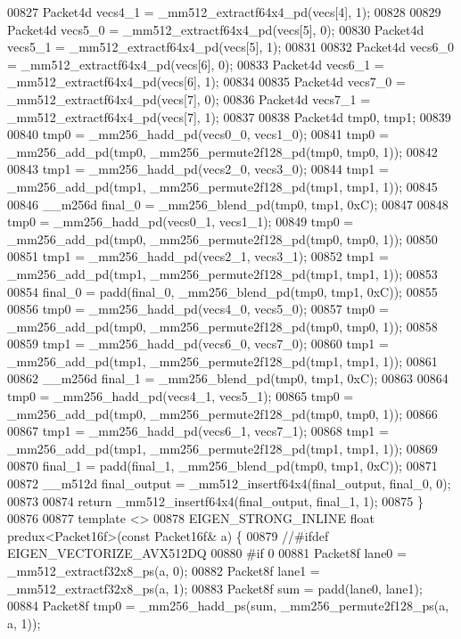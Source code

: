 \begin{DoxyCode}
00827   Packet4d vecs4\_1 = \_mm512\_extractf64x4\_pd(vecs[4], 1);
00828 
00829   Packet4d vecs5\_0 = \_mm512\_extractf64x4\_pd(vecs[5], 0);
00830   Packet4d vecs5\_1 = \_mm512\_extractf64x4\_pd(vecs[5], 1);
00831 
00832   Packet4d vecs6\_0 = \_mm512\_extractf64x4\_pd(vecs[6], 0);
00833   Packet4d vecs6\_1 = \_mm512\_extractf64x4\_pd(vecs[6], 1);
00834 
00835   Packet4d vecs7\_0 = \_mm512\_extractf64x4\_pd(vecs[7], 0);
00836   Packet4d vecs7\_1 = \_mm512\_extractf64x4\_pd(vecs[7], 1);
00837 
00838   Packet4d tmp0, tmp1;
00839 
00840   tmp0 = \_mm256\_hadd\_pd(vecs0\_0, vecs1\_0);
00841   tmp0 = \_mm256\_add\_pd(tmp0, \_mm256\_permute2f128\_pd(tmp0, tmp0, 1));
00842 
00843   tmp1 = \_mm256\_hadd\_pd(vecs2\_0, vecs3\_0);
00844   tmp1 = \_mm256\_add\_pd(tmp1, \_mm256\_permute2f128\_pd(tmp1, tmp1, 1));
00845 
00846   \_\_m256d final\_0 = \_mm256\_blend\_pd(tmp0, tmp1, 0xC);
00847 
00848   tmp0 = \_mm256\_hadd\_pd(vecs0\_1, vecs1\_1);
00849   tmp0 = \_mm256\_add\_pd(tmp0, \_mm256\_permute2f128\_pd(tmp0, tmp0, 1));
00850 
00851   tmp1 = \_mm256\_hadd\_pd(vecs2\_1, vecs3\_1);
00852   tmp1 = \_mm256\_add\_pd(tmp1, \_mm256\_permute2f128\_pd(tmp1, tmp1, 1));
00853 
00854   final\_0 = padd(final\_0, \_mm256\_blend\_pd(tmp0, tmp1, 0xC));
00855 
00856   tmp0 = \_mm256\_hadd\_pd(vecs4\_0, vecs5\_0);
00857   tmp0 = \_mm256\_add\_pd(tmp0, \_mm256\_permute2f128\_pd(tmp0, tmp0, 1));
00858 
00859   tmp1 = \_mm256\_hadd\_pd(vecs6\_0, vecs7\_0);
00860   tmp1 = \_mm256\_add\_pd(tmp1, \_mm256\_permute2f128\_pd(tmp1, tmp1, 1));
00861 
00862   \_\_m256d final\_1 = \_mm256\_blend\_pd(tmp0, tmp1, 0xC);
00863 
00864   tmp0 = \_mm256\_hadd\_pd(vecs4\_1, vecs5\_1);
00865   tmp0 = \_mm256\_add\_pd(tmp0, \_mm256\_permute2f128\_pd(tmp0, tmp0, 1));
00866 
00867   tmp1 = \_mm256\_hadd\_pd(vecs6\_1, vecs7\_1);
00868   tmp1 = \_mm256\_add\_pd(tmp1, \_mm256\_permute2f128\_pd(tmp1, tmp1, 1));
00869 
00870   final\_1 = padd(final\_1, \_mm256\_blend\_pd(tmp0, tmp1, 0xC));
00871 
00872   \_\_m512d final\_output = \_mm512\_insertf64x4(final\_output, final\_0, 0);
00873 
00874   \textcolor{keywordflow}{return} \_mm512\_insertf64x4(final\_output, final\_1, 1);
00875 \}
00876 
00877 \textcolor{keyword}{template} <>
00878 EIGEN\_STRONG\_INLINE \textcolor{keywordtype}{float} predux<Packet16f>(\textcolor{keyword}{const} Packet16f& a) \{
00879   \textcolor{comment}{//#ifdef EIGEN\_VECTORIZE\_AVX512DQ}
00880 \textcolor{preprocessor}{#if 0}
00881   Packet8f lane0 = \_mm512\_extractf32x8\_ps(a, 0);
00882   Packet8f lane1 = \_mm512\_extractf32x8\_ps(a, 1);
00883   Packet8f sum = padd(lane0, lane1);
00884   Packet8f tmp0 = \_mm256\_hadd\_ps(sum, \_mm256\_permute2f128\_ps(a, a, 1));

\end{DoxyCode}
